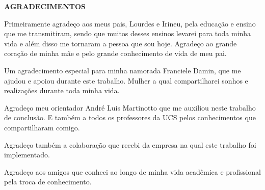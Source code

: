 \begin{center}
\textbf{AGRADECIMENTOS}
\end{center}

Primeiramente agradeço aos meus pais, Lourdes e Irineu, pela educação e ensino que me transmitiram, sendo que
muitos desses ensinos levarei para toda minha vida e além disso me tornaram a pessoa que sou hoje.
Agradeço ao grande coração de minha mãe e pelo grande conhecimento de vida de meu pai.

Um agradecimento especial para minha namorada Franciele Damin, que me ajudou e apoiou durante este trabalho. Mulher a qual compartilharei 
sonhos e realizações durante toda minha vida.

Agradeço meu orientador André Luis Martinotto que me auxiliou neste trabalho de conclusão. E também a todos os professores da UCS pelos 
conhecimentos que compartilharam comigo.

Agradeço também a colaboração que recebi da empresa na qual este trabalho foi implementado.

Agradeço aos amigos que conheci ao longo de minha vida acadêmica e profissional pela troca de conhecimento.
